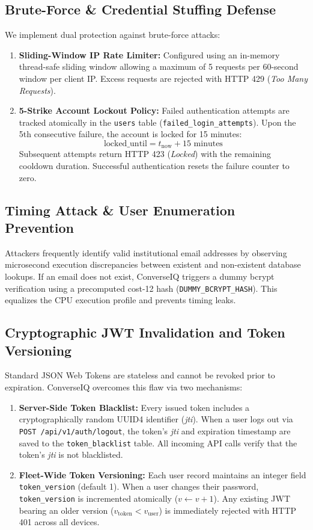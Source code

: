 \documentclass[conference]{IEEEtran}
\begin{document}
\subsection{Brute-Force & Credential Stuffing Defense}
We implement dual protection against brute-force attacks:
\begin{enumerate}
    \item \textbf{Sliding-Window IP Rate Limiter:} Configured using an in-memory thread-safe sliding window allowing a maximum of 5 requests per 60-second window per client IP. Excess requests are rejected with HTTP 429 (\textit{Too Many Requests}).
    \item \textbf{5-Strike Account Lockout Policy:} Failed authentication attempts are tracked atomically in the \texttt{users} table (\texttt{failed\_login\_attempts}). Upon the 5th consecutive failure, the account is locked for 15 minutes:
    \begin{equation}
    \text{locked\_until} = t_{\text{now}} + 15\text{ minutes}
    \end{equation}
    Subsequent attempts return HTTP 423 (\textit{Locked}) with the remaining cooldown duration. Successful authentication resets the failure counter to zero.
\end{enumerate}

\subsection{Timing Attack & User Enumeration Prevention}
Attackers frequently identify valid institutional email addresses by observing microsecond execution discrepancies between existent and non-existent database lookups. If an email does not exist, ConverseIQ triggers a dummy bcrypt verification using a precomputed cost-12 hash (\texttt{DUMMY\_BCRYPT\_HASH}). This equalizes the CPU execution profile and prevents timing leaks.

\subsection{Cryptographic JWT Invalidation and Token Versioning}
Standard JSON Web Tokens are stateless and cannot be revoked prior to expiration. ConverseIQ overcomes this flaw via two mechanisms:
\begin{enumerate}
    \item \textbf{Server-Side Token Blacklist:} Every issued token includes a cryptographically random UUID4 identifier (\textit{jti}). When a user logs out via \texttt{POST /api/v1/auth/logout}, the token's \textit{jti} and expiration timestamp are saved to the \texttt{token\_blacklist} table. All incoming API calls verify that the token's \textit{jti} is not blacklisted.
    \item \textbf{Fleet-Wide Token Versioning:} Each user record maintains an integer field \texttt{token\_version} (default 1). When a user changes their password, \texttt{token\_version} is incremented atomically ($v \leftarrow v + 1$). Any existing JWT bearing an older version ($v_{\text{token}} < v_{\text{user}}$) is immediately rejected with HTTP 401 across all devices.
\end{enumerate}
\end{document}

